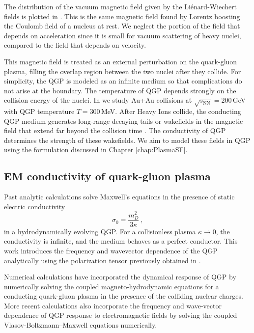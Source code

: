 The distribution of the vacuum magnetic field given by the Li\'enard-Wiechert fields is plotted in . This is the same magnetic field found by Lorentz boosting the Coulomb field of a nucleus at rest. We neglect the portion of the field that depends on acceleration since it is small for vacuum scattering of heavy nuclei, compared to the field that depends on velocity.

This magnetic field is treated as an external perturbation on the quark-gluon plasma, filling the overlap region between the two nuclei after they collide. For simplicity, the QGP is modeled as an infinite medium so that complications do not arise at the boundary. The temperature of QGP depends strongly on the collision energy of the nuclei. In \cite{Grayson:2022asf} we study Au+Au collisions at $\sqrt{s_{\text{NN}}}=200\,$GeV with QGP temperature $T=300$\,MeV.  After Heavy Ions collide, the conducting QGP medium generates long-range decaying tails or wakefields in the magnetic field that extend far beyond the collision time \cite{Tuchin:2010vs}. The conductivity of QGP determines the strength of these wakefields. We aim to model these fields in QGP using the formulation discussed in Chapter \ref{chap:PlasmaSF}.

\subsection{EM conductivity of quark-gluon plasma}

Past analytic calculations \cite{Tuchin:2010vs,Deng:2012pc,McLerran:2013hla,Tuchin:2013apa,Gursoy:2014aka,Li:2016tel,Roy:2015kma} solve Maxwell's equations in the presence of static electric conductivity 
\begin{equation}
   \sigma_0 = \frac{m_D^2}{3\kappa}\,,
\end{equation} 
in a  hydrodynamically evolving QGP. For a collisionless plasma $\kappa\rightarrow0$, the conductivity is infinite, and the medium behaves as a perfect conductor. This work introduces the frequency and wavevector dependence of the QGP analytically using the polarization tensor previously obtained in \cite{Formanek:2021blc}.

Numerical calculations \cite{Inghirami:2016iru,Inghirami:2019mkc} have incorporated the dynamical response of QGP by numerically solving the coupled magneto-hydrodynamic equations for a conducting quark-gluon plasma in the presence of the colliding nuclear charges. More recent calculations \cite{Yan:2021zjc,Wang:2021oqq} also incorporate the frequency and wave-vector dependence of QGP response to electromagnetic fields by solving the coupled Vlasov-Boltzmann--Maxwell equations numerically.



